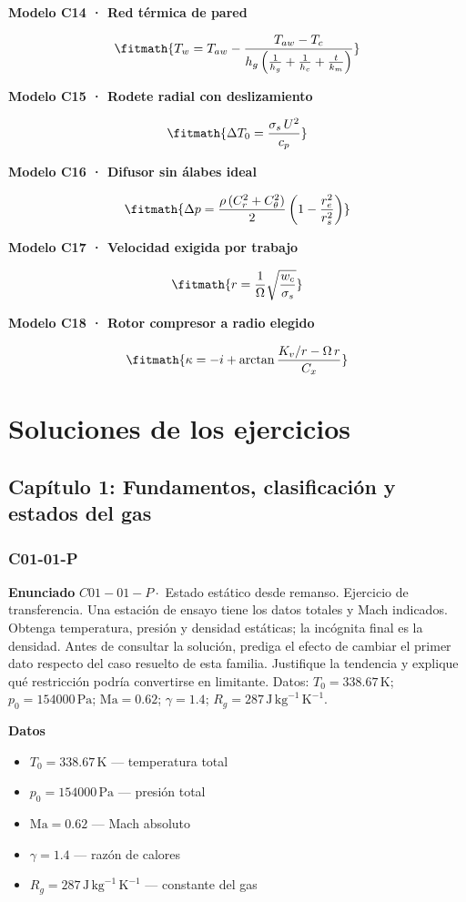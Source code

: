 \documentclass[10pt,openany]{book}
\begin{document}
\noindent\textbf{Modelo C14 · Red térmica de pared}

\[
\fitmath{T_w=T_{aw}-\frac{T_{aw}-T_c}{h_g\left(\frac1{h_g}+\frac1{h_c}+\frac{t}{k_m}\right)}}
\]

\noindent\textbf{Modelo C15 · Rodete radial con deslizamiento}

\[
\fitmath{\Delta T_0=\frac{\sigma_s\,U^2}{c_p}}
\]

\noindent\textbf{Modelo C16 · Difusor sin álabes ideal}

\[
\fitmath{\Delta p=\frac{\rho\,(C_r^2+C_\theta^2)}{2}\left(1-\frac{r_e^2}{r_s^2}\right)}
\]

\noindent\textbf{Modelo C17 · Velocidad exigida por trabajo}

\[
\fitmath{r=\frac{1}{\Omega}\sqrt{\frac{w_c}{\sigma_s}}}
\]

\noindent\textbf{Modelo C18 · Rotor compresor a radio elegido}

\[
\fitmath{\kappa=-i+\arctan\frac{K_v/r-\Omega\,r}{C_x}}
\]

\chapter{Soluciones de los ejercicios}
\section{Capítulo 1: Fundamentos, clasificación y estados del gas}
\subsection*{C01-01-P}

\noindent\textbf{Enunciado}
\(C01-01-P \cdot\) Estado estático desde remanso. Ejercicio de transferencia. Una estación de ensayo tiene los datos totales y Mach indicados. Obtenga temperatura, presión y densidad estáticas; la incógnita final es la densidad. Antes de consultar la solución, prediga el efecto de cambiar el primer dato respecto del caso resuelto de esta familia. Justifique la tendencia y explique qué restricción podría convertirse en limitante. Datos: \(T_0=338.67\, \mathrm{K}\); \(p_0=154000\, \mathrm{Pa}\); \(\mathrm{Ma}=0.62\); \(\gamma=1.4\); \(R_g=287\, \mathrm{J}\,\mathrm{kg}^{-1}\,\mathrm{K}^{-1}\).

\noindent\textbf{Datos}
\begin{itemize}
\item $T_0 = 338.67\,\mathrm{K}$ — temperatura total
\item $p_0 = 154000\,\mathrm{Pa}$ — presión total
\item $\mathrm{Ma} = 0.62$ — Mach absoluto
\item $\gamma = 1.4$ — razón de calores
\item $R_g = 287\,\mathrm{J}\,\mathrm{kg}^{-1}\,\mathrm{K}^{-1}$ — constante del gas
\end{itemize}
\end{document}
